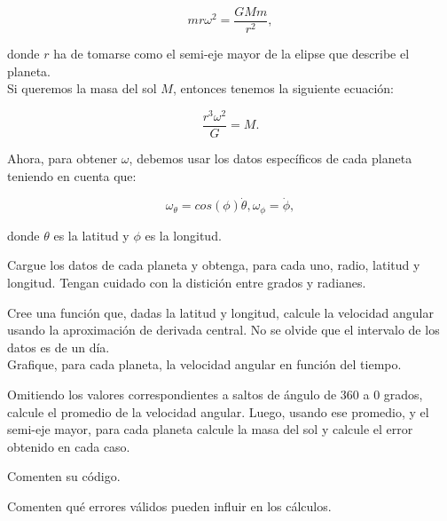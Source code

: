 \documentclass[11pt,letterpaper]{exam}
\begin{document}
\begin{equation}
mr\omega^2 = \frac{GMm}{r^2},
\end{equation}

donde $r$ ha de tomarse como el semi-eje mayor de la elipse que describe el planeta.\\

Si queremos la masa del sol $M$, entonces tenemos la siguiente ecuaci\'on:

\begin{equation}
\frac{r^3\omega^2}{G} = M.
\end{equation}

Ahora, para obtener $\omega$, debemos usar los datos espec\'ificos de cada planeta teniendo en cuenta que:

\begin{equation}
\omega_\theta = cos(\phi)\dot{\theta},
\omega_\phi = \dot{\phi},
\end{equation}

donde $\theta$ es la latitud y  $\phi$ es la longitud.

\begin{questions}


Cargue los datos de cada planeta y obtenga, para cada uno, radio, latitud y longitud. Tengan cuidado con la distici\'on entre grados y radianes.


Cree una funci\'on que, dadas la latitud y longitud, calcule la velocidad angular usando la aproximaci\'on de derivada central. No se olvide que el intervalo de los datos es de un d\'ia.\\

Grafique, para cada planeta, la velocidad angular en funci\'on del tiempo.\\


Omitiendo los valores correspondientes a saltos de \'angulo de 360 a 0 grados, calcule el promedio de la velocidad angular. Luego, usando ese promedio, y el semi-eje mayor, para cada planeta calcule la masa del sol y calcule el error obtenido en cada caso.


Comenten su c\'odigo.


Comenten qu\'e errores v\'alidos pueden influir en los c\'alculos.

\end{questions}
\end{document}

